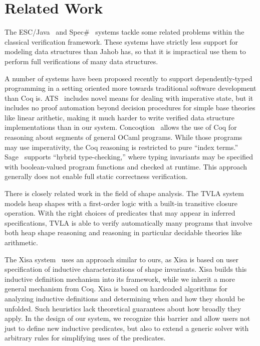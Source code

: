 \documentclass[preprint,nocopyrightspace]{sigplanconf}
\begin{document}
{\section{Related Work}

The ESC/Java~\cite{esc-java} and Spec\#~\cite{spec-sharp} systems tackle some related problems within the classical verification framework.  These systems have strictly less support for modeling data structures than Jahob has, so that it is impractical use them to perform full verifications of many data structures.

A number of systems have been proposed recently to support dependently-typed programming in a setting oriented more towards traditional software development than Coq is.  ATS~\cite{ats} includes novel means for dealing with imperative state, but it includes no proof automation beyond decision procedures for simple base theories like linear arithetic, making it much harder to write verified data structure implementations than in our system.  Concoqtion~\cite{concoqtion} allows the use of Coq for reasoning about segments of general OCaml programs.  While those programs may use imperativity, the Coq reasoning is restricted to pure ``index terms.''  Sage~\cite{sage} supports ``hybrid type-checking,'' where typing invariants may be specified with boolean-valued program functions and checked at runtime.  This approach generally does not enable full static correctness verification.

There is closely related work in the field of shape analysis.  The TVLA system~\cite{tvla} models heap shapes with a first-order logic with a built-in transitive closure operation.  With the right choices of predicates that may appear in inferred specifications, TVLA is able to verify automatically many programs that involve both heap shape reasoning and reasoning in particular decidable theories like arithmetic.

The Xisa system~\cite{xisa} uses an approach similar to ours, as Xisa is based on user specification of inductive characterizations of shape invariants.  Xisa builds this inductive definition mechanism into its framework, while we inherit a more general mechanism from Coq.  Xisa is based on hardcoded algorithms for analyzing inductive definitions and determining when and how they should be unfolded.  Such heuristics lack theoretical guarantees about how broadly they apply.  In the design of our system, we recognize this barrier and allow users not just to define new inductive predicates, but also to extend a generic solver with arbitrary rules for simplifying uses of the predicates.

}
\end{document}
